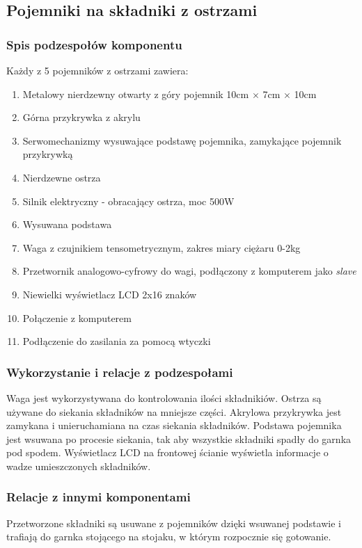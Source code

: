 \documentclass[12pt,a4paper,notitlepage]{article}
\begin{document}
\subsection{Pojemniki na składniki z ostrzami}
\subsubsection{Spis podzespołów komponentu}
Każdy z 5 pojemników z ostrzami zawiera:
\begin{enumerate}
  \item Metalowy nierdzewny otwarty z góry pojemnik 10cm $\times$ 7cm $\times$ 10cm
  \item Górna przykrywka z akrylu
  \item Serwomechanizmy wysuwające podstawę pojemnika, zamykające pojemnik przykrywką
  \item Nierdzewne ostrza
  \item Silnik elektryczny - obracający ostrza, moc 500W
  \item Wysuwana podstawa
  \item Waga z czujnikiem tensometrycznym, zakres miary ciężaru 0-2kg
  \item Przetwornik analogowo-cyfrowy do wagi, podłączony z komputerem jako \emph{slave}
  \item Niewielki wyświetlacz LCD 2x16 znaków
  \item Połączenie z komputerem
  \item Podłączenie do zasilania za pomocą wtyczki
\end{enumerate}
 
\subsubsection{Wykorzystanie i relacje z podzespołami}
Waga jest wykorzystywana do kontrolowania ilości składnikiów. Ostrza są używane do siekania składników na mniejsze części. Akrylowa przykrywka jest zamykana i unieruchamiana na czas siekania składników. Podstawa pojemnika jest wsuwana po procesie siekania, tak aby wszystkie składniki spadły do garnka pod spodem. Wyświetlacz LCD na frontowej ścianie wyświetla informacje o wadze umieszczonych składników.

\subsubsection{Relacje z innymi komponentami}
Przetworzone składniki są usuwane z pojemników dzięki wsuwanej podstawie i trafiają do garnka stojącego na stojaku, w którym rozpocznie się gotowanie.
\end{document}
